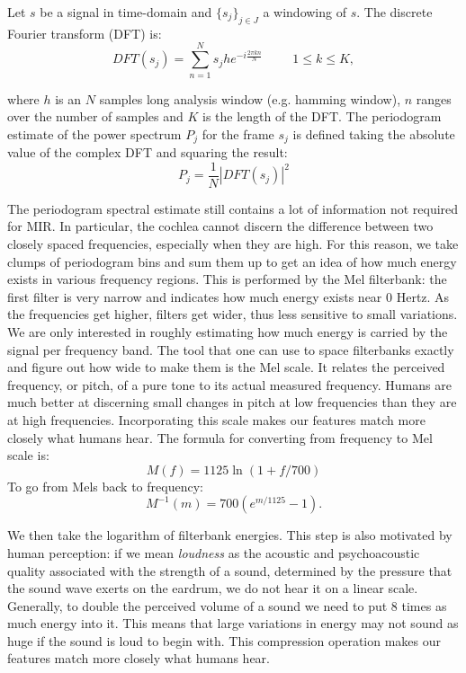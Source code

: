 \documentclass[english, LaM, oneside, noexaminfo]{sapthesis}
\begin{document}
Let $s$ be a signal in time-domain and $\{s_j\}_{j\in J}$ a windowing of $s$. The discrete Fourier transform (DFT)  is: $$DFT(s_j) = \sum_{n=1}^N s_jhe^{-i\frac{2\pi kn}{N}} \hspace{1cm} 1 \leq k \leq K,$$

\noindent where $h$ is an $N$ samples long analysis window (e.g. hamming window), $n$ ranges over the number of samples and $K$ is the length of the DFT. The periodogram estimate of the power spectrum $P_j$ for the frame $s_j$ is defined taking the absolute value of the complex DFT and squaring the result: $$P_j = \frac{1}{N} |DFT(s_j)|^2$$

\noindent The periodogram spectral estimate still contains a lot of information not required for MIR. In particular, the cochlea cannot discern the difference between two closely spaced frequencies, especially when they are high. For this reason, we take clumps of periodogram bins and sum them up to get an idea of how much energy exists in various frequency regions. This is performed by the Mel filterbank: the first filter is very narrow and indicates how much energy exists near 0 Hertz. As the frequencies get higher, filters get wider, thus less sensitive to small variations. We are only interested in roughly estimating how much energy is carried by the signal per frequency band. The tool that one can use to space filterbanks exactly and figure out how wide to make them is the Mel scale.
It relates the perceived frequency, or pitch, of a pure tone to its actual measured frequency. Humans are much better at discerning small changes in pitch at low frequencies than they are at high frequencies. Incorporating this scale makes our features match more closely what humans hear. The formula for converting from frequency to Mel scale is:
$$M(f) = 1125 \ln(1+f/700)$$
To go from Mels back to frequency:
$$M^{-1}(m) = 700 (e^{m/1125}-1).$$

We then take the logarithm of filterbank energies. This step is also motivated by human perception: if we mean \textit{loudness} as the acoustic and psychoacoustic quality associated with the strength of a sound, determined by the pressure that the sound wave exerts on the eardrum, we do not hear it on a linear scale. Generally, to double the perceived volume of a sound we need to put 8 times as much energy into it. This means that large variations in energy may not sound as huge if the sound is loud to begin with. This compression operation makes our features match more closely what humans hear.
\end{document}
